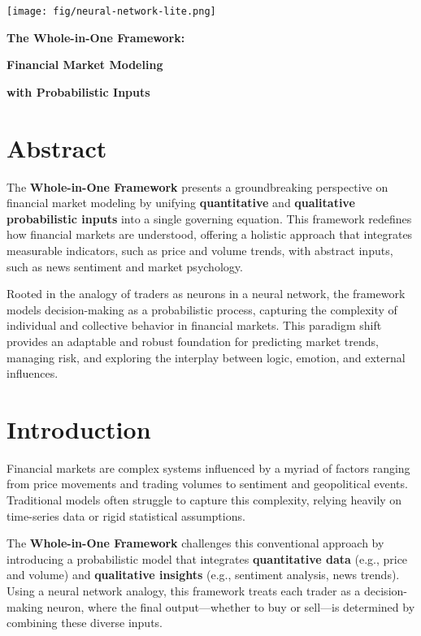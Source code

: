 \documentclass[a4]{article}
\newcommand{\bn}{\bigskip\noindent}
\newcommand{\mn}{\medskip\noindent}
\begin{document}
\begin{center}
\texttt{[image: fig/neural-network-lite.png]}
\end{center}

\mn
{\huge\bf The Whole-in-One Framework:}

\bn
{\huge\bf Financial Market Modeling}

\bn
{\huge\bf with Probabilistic Inputs}

\bn
\section*{Abstract}
The {\bf Whole-in-One Framework}  presents a groundbreaking perspective on financial market modeling by unifying {\bf quantitative}  and {\bf qualitative probabilistic inputs}  into a single governing equation. This framework redefines how financial markets are understood, offering a holistic approach that integrates measurable indicators, such as price and volume trends, with abstract inputs, such as news sentiment and market psychology.

\bn
Rooted in the analogy of traders as neurons in a neural network, the framework models decision-making as a probabilistic process, capturing the complexity of individual and collective behavior in financial markets. This paradigm shift provides an adaptable and robust foundation for predicting market trends, managing risk, and exploring the interplay between logic, emotion, and external influences.


\bn
\section{Introduction}

Financial markets are complex systems influenced by a myriad of factors ranging from price movements and trading volumes to sentiment and geopolitical events. Traditional models often struggle to capture this complexity, relying heavily on time-series data or rigid statistical assumptions. 

\bn
The {\bf Whole-in-One Framework}  challenges this conventional approach by introducing a probabilistic model that integrates {\bf quantitative data}  (e.g., price and volume) and {\bf qualitative insights}  (e.g., sentiment analysis, news trends). Using a neural network analogy, this framework treats each trader as a decision-making neuron, where the final output---whether to buy or sell---is determined by combining these diverse inputs.
\end{document}
